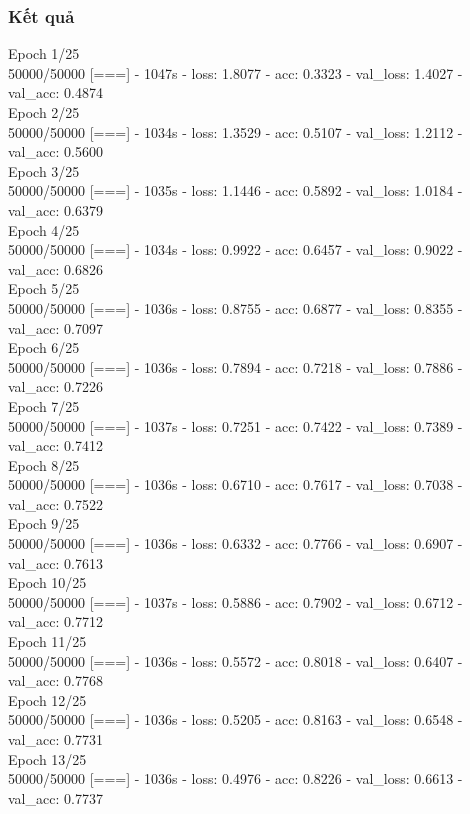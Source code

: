 \documentclass[a4paper,12pt]{report}
\begin{document}
\subsubsection{Kết quả}
{\small
Epoch 1/25 \\
50000/50000 [===] - 1047s - loss: 1.8077 - acc: 0.3323 - val\_loss: 1.4027 - val\_acc: 0.4874 \\
Epoch 2/25 \\
50000/50000 [===] - 1034s - loss: 1.3529 - acc: 0.5107 - val\_loss: 1.2112 - val\_acc: 0.5600 \\
Epoch 3/25 \\
50000/50000 [===] - 1035s - loss: 1.1446 - acc: 0.5892 - val\_loss: 1.0184 - val\_acc: 0.6379 \\
Epoch 4/25 \\
50000/50000 [===] - 1034s - loss: 0.9922 - acc: 0.6457 - val\_loss: 0.9022 - val\_acc: 0.6826 \\
Epoch 5/25 \\
50000/50000 [===] - 1036s - loss: 0.8755 - acc: 0.6877 - val\_loss: 0.8355 - val\_acc: 0.7097 \\
Epoch 6/25 \\
50000/50000 [===] - 1036s - loss: 0.7894 - acc: 0.7218 - val\_loss: 0.7886 - val\_acc: 0.7226 \\
Epoch 7/25 \\
50000/50000 [===] - 1037s - loss: 0.7251 - acc: 0.7422 - val\_loss: 0.7389 - val\_acc: 0.7412 \\
Epoch 8/25 \\
50000/50000 [===] - 1036s - loss: 0.6710 - acc: 0.7617 - val\_loss: 0.7038 - val\_acc: 0.7522 \\
Epoch 9/25 \\
50000/50000 [===] - 1036s - loss: 0.6332 - acc: 0.7766 - val\_loss: 0.6907 - val\_acc: 0.7613 \\
Epoch 10/25 \\
50000/50000 [===] - 1037s - loss: 0.5886 - acc: 0.7902 - val\_loss: 0.6712 - val\_acc: 0.7712 \\
Epoch 11/25 \\
50000/50000 [===] - 1036s - loss: 0.5572 - acc: 0.8018 - val\_loss: 0.6407 - val\_acc: 0.7768 \\
Epoch 12/25 \\
50000/50000 [===] - 1036s - loss: 0.5205 - acc: 0.8163 - val\_loss: 0.6548 - val\_acc: 0.7731 \\
Epoch 13/25 \\
50000/50000 [===] - 1036s - loss: 0.4976 - acc: 0.8226 - val\_loss: 0.6613 - val\_acc: 0.7737 \\
}
\end{document}
